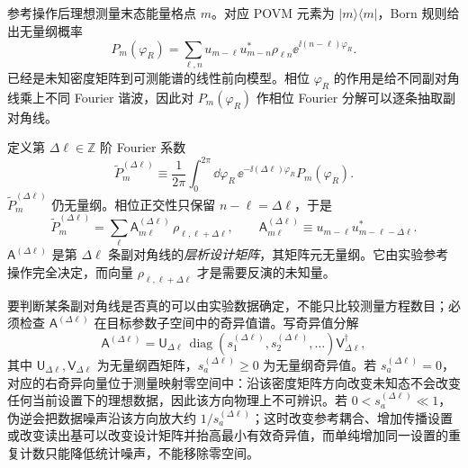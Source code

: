 \begin{exbox}[能量格与纵向相空间层析]
参考操作后理想测量末态能量格点 $m$。对应 POVM 元素为 $|m\rangle\langle m|$，Born 规则给出无量纲概率
\begin{equation}
\boxed{
P_m(\varphi_R)
=\sum_{\ell,n}
 u_{m-\ell}u_{m-n}^*\rho_{\ell n}
\ee^{\ii(n-\ell)\varphi_R}.}
\label{eq:electron_tomography_linear}
\end{equation}
 已经是未知密度矩阵到可测能谱的线性前向模型。相位 $\varphi_R$ 的作用是给不同副对角线乘上不同 Fourier 谐波，因此对 $P_m(\varphi_R)$ 作相位 Fourier 分解可以逐条抽取副对角线。

定义第 $\Delta\ell\in\mathbb Z$ 阶 Fourier 系数
\begin{equation*}
\widetilde P_m^{(\Delta\ell)}
\equiv\frac{1}{2\pi}
\int_0^{2\pi}\dd\varphi_R\,
\ee^{-\ii (\Delta\ell)\varphi_R}P_m(\varphi_R).
\end{equation*}
$\widetilde P_m^{(\Delta\ell)}$ 仍无量纲。相位正交性只保留 $n-\ell=\Delta\ell$，于是
\begin{equation}
\boxed{
\widetilde P_m^{(\Delta\ell)}
=\sum_\ell \mathsf A_{m\ell}^{(\Delta\ell)}\,
\rho_{\ell,\ell+\Delta\ell},
\qquad
\mathsf A_{m\ell}^{(\Delta\ell)}
\equiv u_{m-\ell}u_{m-\ell-\Delta\ell}^*.}
\label{eq:electron_tomography_side_diagonal}
\end{equation}
$\mathsf A^{(\Delta\ell)}$ 是第 $\Delta\ell$ 条副对角线的\emph{层析设计矩阵}，其矩阵元无量纲。它由实验参考操作完全决定，而向量 $\rho_{\ell,\ell+\Delta\ell}$ 才是需要反演的未知量。

要判断某条副对角线是否真的可以由实验数据确定，不能只比较测量方程数目；必须检查 $\mathsf A^{(\Delta\ell)}$ 在目标参数子空间中的奇异值谱。写奇异值分解
\begin{equation}
\boxed{
\mathsf A^{(\Delta\ell)}
=\mathsf U_{\Delta\ell}\,
\operatorname{diag}(s_1^{(\Delta\ell)},s_2^{(\Delta\ell)},\ldots)
\mathsf V_{\Delta\ell}^\dagger,}
\label{eq:electron_tomography_svd}
\end{equation}
其中 $\mathsf U_{\Delta\ell},\mathsf V_{\Delta\ell}$ 为无量纲酉矩阵，$s_a^{(\Delta\ell)}\ge0$ 为无量纲奇异值。若 $s_a^{(\Delta\ell)}=0$，对应的右奇异向量位于测量映射零空间中：沿该密度矩阵方向改变未知态不会改变任何当前设置下的理想数据，因此该方向物理上不可辨识。若 $0<s_a^{(\Delta\ell)}\ll1$，伪逆会把数据噪声沿该方向放大约 $1/s_a^{(\Delta\ell)}$；这时改变参考耦合、增加传播设置或改变读出基可以改变设计矩阵并抬高最小有效奇异值，而单纯增加同一设置的重复计数只能降低统计噪声，不能移除零空间。


\end{exbox}
